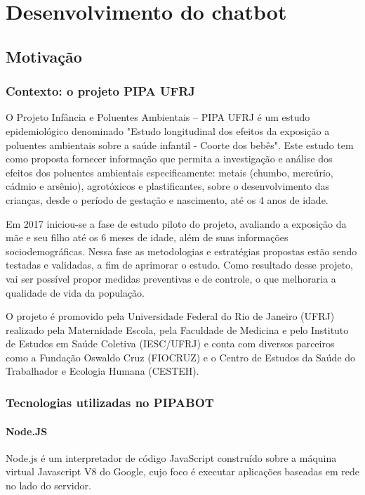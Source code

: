   \chapter{Desenvolvimento do chatbot}
  
  \section{Motivação}
  
  \subsection{Contexto: o projeto PIPA UFRJ}
  
  O Projeto Infância e Poluentes Ambientais – PIPA UFRJ é um estudo epidemiológico denominado "Estudo longitudinal dos efeitos da exposição a poluentes ambientais sobre a saúde infantil - Coorte dos bebês". Este estudo tem como proposta fornecer informação que permita a investigação e análise dos efeitos dos poluentes ambientais especificamente: metais (chumbo, mercúrio, cádmio e arsênio), agrotóxicos e plastificantes, sobre o desenvolvimento das crianças, desde o período de gestação e nascimento, até os 4 anos de idade. 
  
  Em 2017 iniciou-se a fase de estudo piloto do projeto, avaliando a exposição da mãe e seu filho até os 6 meses de idade, além de suas informações sociodemográficas. Nessa fase as metodologias e estratégias propostas estão sendo testadas e validadas, a fim de aprimorar o estudo. Como resultado desse projeto, vai ser possível propor medidas preventivas e de controle, o que melhoraria a qualidade de vida da população.
  
  O projeto é promovido pela Universidade Federal do Rio de Janeiro (UFRJ) realizado pela Maternidade Escola, pela Faculdade de Medicina e pelo Instituto de Estudos em Saúde Coletiva (IESC/UFRJ) e conta com diversos parceiros como a Fundação Oswaldo Cruz (FIOCRUZ) e o Centro de Estudos da Saúde do Trabalhador e Ecologia Humana (CESTEH).
  
  \subsection{Tecnologias utilizadas no PIPABOT}
  \subsubsection{Node.JS}
  Node.js é um interpretador de código JavaScript construído sobre a máquina virtual Javascript V8 do Google, cujo foco é executar aplicações baseadas em rede no lado do servidor.
  
